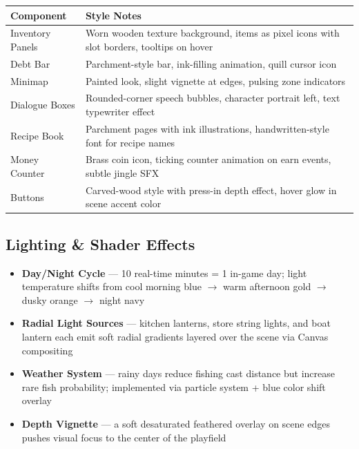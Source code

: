 \documentclass[11pt, letterpaper]{article}
\newcommand{\altrow}{\rowcolor{rowalt}}
\begin{document}
\vspace{4pt}
\begin{tabularx}{\textwidth}{L{3.2cm} X}
\toprule
{}
\textbf{\color{white}Component} & \textbf{\color{white}Style Notes} \\
\midrule
Inventory Panels  & Worn wooden texture background, items as pixel icons with slot borders, tooltips on hover \\
\altrow
Debt Bar          & Parchment-style bar, ink-filling animation, quill cursor icon \\
Minimap           & Painted look, slight vignette at edges, pulsing zone indicators \\
\altrow
Dialogue Boxes    & Rounded-corner speech bubbles, character portrait left, text typewriter effect \\
Recipe Book       & Parchment pages with ink illustrations, handwritten-style font for recipe names \\
\altrow
Money Counter     & Brass coin icon, ticking counter animation on earn events, subtle jingle SFX \\
Buttons           & Carved-wood style with press-in depth effect, hover glow in scene accent color \\
\bottomrule
\end{tabularx}

\subsection{Lighting \& Shader Effects}

\begin{itemize}
  \item \textbf{Day/Night Cycle} --- 10 real-time minutes = 1 in-game day; light temperature shifts from cool morning blue $\rightarrow$ warm afternoon gold $\rightarrow$ dusky orange $\rightarrow$ night navy
  \item \textbf{Radial Light Sources} --- kitchen lanterns, store string lights, and boat lantern each emit soft radial gradients layered over the scene via Canvas compositing
  \item \textbf{Weather System} --- rainy days reduce fishing cast distance but increase rare fish probability; implemented via particle system + blue color shift overlay
  \item \textbf{Depth Vignette} --- a soft desaturated feathered overlay on scene edges pushes visual focus to the center of the playfield
\end{itemize}
\end{document}
